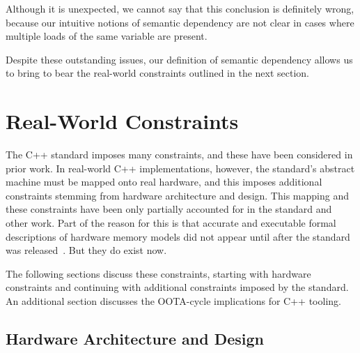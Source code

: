 \documentclass[10]{article}
\begin{document}
Although it is unexpected, we cannot say that this conclusion is
definitely wrong, because our intuitive notions of semantic
dependency are not clear in cases where multiple loads of the same
variable are present.

\medskip

Despite these outstanding issues, our definition of semantic dependency
allows us to bring to bear the real-world constraints outlined in the
next section.

\section{Real-World Constraints}
\label{sec:Real-World Constraints}

The C++ standard imposes many constraints, and these have been considered
in prior work.
In real-world C++ implementations, however, the standard's abstract machine
must be mapped onto real hardware, and this imposes additional
constraints stemming from hardware architecture and design.
This mapping and these constraints have been only partially accounted
for in the standard and other work.
Part of the reason for this is
that accurate and executable formal descriptions of hardware memory
models did not appear until after the standard was
released~\cite{JadeAlglave2011ppcmem,Maranget2012TutorialARMPower}.
But they do exist now.

The following sections discuss these constraints, starting with
hardware constraints and continuing with additional constraints imposed
by the standard.
An additional section discusses the OOTA-cycle implications for C++
tooling.

\subsection{Hardware Architecture and Design}
\label{sec:Hardware Architecture and Design}
\end{document}
